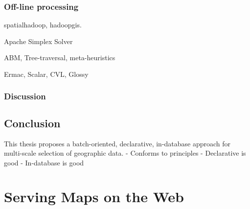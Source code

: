 \documentclass[11pt, oneside]{report}
\begin{document}
\subsection{Off-line processing}

spatialhadoop, hadoopgis.

Apache Simplex Solver

ABM, Tree-traversal, meta-heuristics

Ermac, Scalar, CVL, Glossy

\subsection{Discussion}


\section{Conclusion}

This thesis proposes a batch-oriented, declarative, in-database approach for multi-scale selection of geographic data.
- Conforms to principles
- Declarative is good
- In-database is good




\chapter{Serving Maps on the Web}

\end{document}
